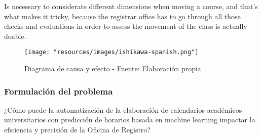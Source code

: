 Is necessary to considerate different dimensions when moving a course, and that's what makes it tricky, because the registrar office has to go through all those checks and evaluations in order to assess the movement of the class is actually doable.

\begin{figure}[H]
    \centering
    \texttt{[image: "resources/images/ishikawa-spanish.png"]}
    \caption{Diagrama de causa y efecto - Fuente: Elaboración propia}
    \label{fig:ishikawa}
\end{figure}

\subsubsection{Formulación del problema}
¿Cómo puede la automatización de la elaboración de calendarios académicos universitarios con predicción de horarios basada en machine learning impactar la eficiencia y precisión de la Oficina de Registro?
